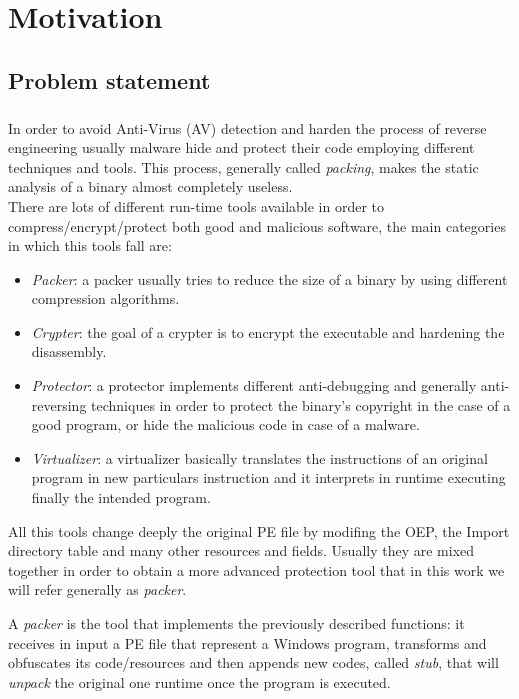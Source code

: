 \chapter{Motivation}
\label{chapter2}
\thispagestyle{empty}

\section{Problem statement}
\paragraph{}
In order to avoid Anti-Virus (AV) detection and harden the process of reverse engineering usually malware hide and protect their code employing different techniques and tools. This process, generally called \textit{packing}, makes the static analysis of a binary almost completely useless.\\There are lots of different run-time tools available in order to compress/encrypt/protect both good and malicious software, the main categories in which this tools fall are:
\begin{itemize}
\item \emph{Packer}: a packer usually tries to reduce the size of a binary by using different compression algorithms.
\item \emph{Crypter}: the goal of a crypter is to encrypt the executable and hardening the disassembly.
\item \emph{Protector}: a protector implements different anti-debugging and generally anti-reversing techniques in order to protect the binary's copyright in the case of a good program, or hide the malicious code in case of a malware.
\item \emph{Virtualizer}: a virtualizer basically translates the instructions of an original program in new particulars instruction and it interprets in runtime executing finally the intended program.
\end{itemize}

All this tools change deeply the original PE file by modifing the OEP, the Import directory table and many other resources and fields. Usually they are mixed together in order to obtain a more advanced protection tool that in this work we will refer generally as \textit{packer}.

A \textit{packer} is the tool that implements the previously described functions: it receives in input a PE file that represent a Windows program, transforms and obfuscates its code/resources and then appends new codes, called \textit{stub}, that will \textit{unpack} the original one runtime once the program is executed.\\\\

